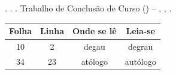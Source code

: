 \begin{errata}
  \SingleSpacing
  \noindent\MakeTextUppercase{\imprimirautor}. \textbf{\imprimirtitulo}.
  \imprimirdata. Trabalho de Conclusão de Curso (\imprimirgrau) --
  \imprimirinstituicao, \imprimirlocal, \imprimirdata.

  \vspace{\baselineskip}
  \begin{table}[htb]
    \centering
    \begin{tabular}{cccc}
      \toprule
      \textbf{Folha} & \textbf{Linha} & \textbf{Onde se lê} & \textbf{Leia-se} \\
      \midrule
      10 & 2  & degau   & degrau   \\
      34 & 23 & atólogo & autólogo \\
      \bottomrule
    \end{tabular}
  \end{table}
\end{errata}
